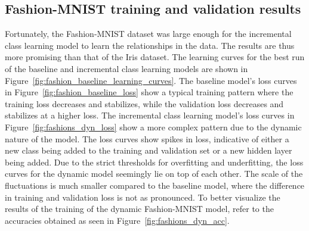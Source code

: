 \documentclass[conference]{IEEEtran}
\begin{document}
\subsection{Fashion-MNIST training and validation results}
Fortunately, the Fashion-MNIST dataset was large enough for the incremental class learning model to learn the relationships in the data. The results are thus more 
promising than that of the Iris dataset.
The learning curves for the best run of the baseline and incremental class learning models are shown in Figure~\ref{fig:fashion_baseline_learning_curves}. 
The baseline model's loss curves in Figure~\ref{fig:fashion_baseline_loss} show a typical training pattern where the training loss decreases and stabilizes,
 while the validation loss decreases and stabilizes at a higher loss. The incremental class learning model's loss curves in Figure~\ref{fig:fashions_dyn_loss} show a more complex pattern due to 
 the dynamic nature of the model. The loss curves show spikes in loss, indicative of either a new class being added to the training and validation set 
or a new hidden layer being added. Due to the strict thresholds for overfitting and underfitting, the loss curves for 
the dynamic model seemingly lie on top of each other. The scale of the fluctuations is much smaller compared to the baseline model, where the difference in training and validation loss is not as pronounced. To better visualize the results of the training of the dynamic 
Fashion-MNIST model, refer to the accuracies obtained as seen in Figure~\ref{fig:fashions_dyn_acc}.

\end{document}
